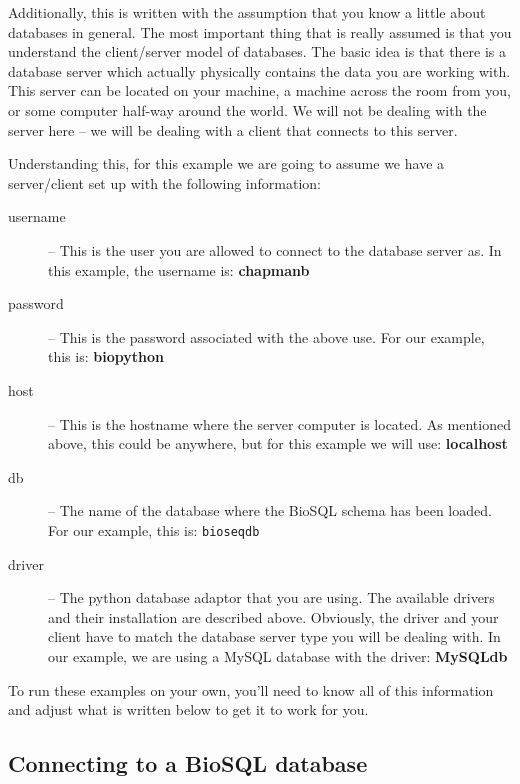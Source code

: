 \documentclass{article}
\begin{document}
Additionally, this is written with the assumption that you know a little
about databases in general. The most important thing that is really
assumed is that you understand the client/server model of databases. The
basic idea is that there is a database server which actually physically
contains the data you are working with. This server can be located on
your machine, a machine across the room from you, or some computer
half-way around the world. We will not be dealing with the server here
-- we will be dealing with a client that connects to this server. 


Understanding this, for this example we are going to assume we have a
server/client set up with the following information:

\begin{description}
  \item[username] -- This is the user you are allowed to connect to the
  database server as. In this example, the username is:
  \textbf{chapmanb}

  \item[password] -- This is the password associated with the above use.
  For our example, this is: \textbf{biopython}

  \item[host] -- This is the hostname where the server computer is
  located. As mentioned above, this could be anywhere, but for this
  example we will use: \textbf{localhost}

  \item[db] -- The name of the database where the BioSQL schema has been
  loaded. For our example, this is: \verb|bioseqdb|

  \item[driver] -- The python database adaptor that you are using. The
  available drivers and their installation are described above.
  Obviously, the driver and your client have to match the database
  server type you will be dealing with. In our example, we are using a
  MySQL database with the driver: \textbf{MySQLdb}
  
\end{description}

To run these examples on your own, you'll need to know all of this
information and adjust what is written below to get it to work for you.

\subsection{Connecting to a BioSQL database}
\end{document}
